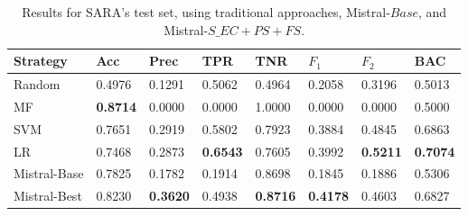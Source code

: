 \begin{table}
\small
\caption{Results for SARA's test set, using traditional approaches, Mistral-$Base$, and Mistral-$S\_EC+PS+FS$.}
\label{table:ml}
\begin{tabular}{@{}p{0.45in}p{0.26in}p{0.26in}p{0.26in}p{0.26in}p{0.26in}p{0.26in}p{0.26in}@{}}
\toprule
Strategy      & Acc             & Prec            & TPR             & TNR             & $F_{1}$         & $F_{2}$         & BAC             \\ \midrule
Random        & 0.4976          & 0.1291          & 0.5062          & 0.4964          & 0.2058          & 0.3196          & 0.5013          \\
MF & \textbf{0.8714} & 0.0000          & 0.0000          & 1.0000          & 0.0000          & 0.0000          & 0.5000          \\
SVM           & 0.7651          & 0.2919          & 0.5802          & 0.7923          & 0.3884          & 0.4845          & 0.6863          \\
LR            & 0.7468          & 0.2873          & \textbf{0.6543} & 0.7605          & 0.3992          & \textbf{0.5211} & \textbf{0.7074} \\
Mistral-Base  & 0.7825          & 0.1782          & 0.1914          & 0.8698          & 0.1845          & 0.1886          & 0.5306          \\
Mistral-Best  & 0.8230          & \textbf{0.3620} & 0.4938          & \textbf{0.8716} & \textbf{0.4178} & 0.4603          & 0.6827          \\ \bottomrule
\end{tabular}
\end{table}

